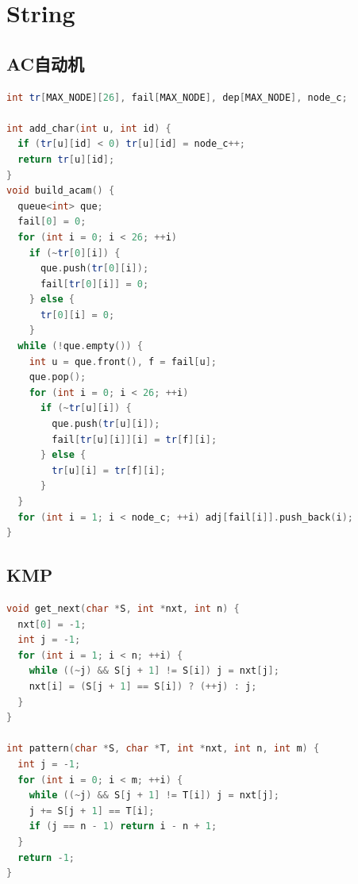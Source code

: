 \documentclass[twoside]{article}
\begin{document}
\section{String}

\subsection{AC自动机}
\begin{lstlisting}[language=c++]
int tr[MAX_NODE][26], fail[MAX_NODE], dep[MAX_NODE], node_c;

int add_char(int u, int id) {
  if (tr[u][id] < 0) tr[u][id] = node_c++;
  return tr[u][id];
}
void build_acam() {
  queue<int> que;
  fail[0] = 0;
  for (int i = 0; i < 26; ++i)
    if (~tr[0][i]) {
      que.push(tr[0][i]);
      fail[tr[0][i]] = 0;
    } else {
      tr[0][i] = 0;
    }
  while (!que.empty()) {
    int u = que.front(), f = fail[u];
    que.pop();
    for (int i = 0; i < 26; ++i)
      if (~tr[u][i]) {
        que.push(tr[u][i]);
        fail[tr[u][i]][i] = tr[f][i];
      } else {
        tr[u][i] = tr[f][i];
      }
  }
  for (int i = 1; i < node_c; ++i) adj[fail[i]].push_back(i);
}

\end{lstlisting}
\subsection{KMP}
\begin{lstlisting}[language=c++]
void get_next(char *S, int *nxt, int n) {
  nxt[0] = -1;
  int j = -1;
  for (int i = 1; i < n; ++i) {
    while ((~j) && S[j + 1] != S[i]) j = nxt[j];
    nxt[i] = (S[j + 1] == S[i]) ? (++j) : j;
  }
}

int pattern(char *S, char *T, int *nxt, int n, int m) {
  int j = -1;
  for (int i = 0; i < m; ++i) {
    while ((~j) && S[j + 1] != T[i]) j = nxt[j];
    j += S[j + 1] == T[i];
    if (j == n - 1) return i - n + 1;
  }
  return -1;
}

\end{lstlisting}
\end{document}

